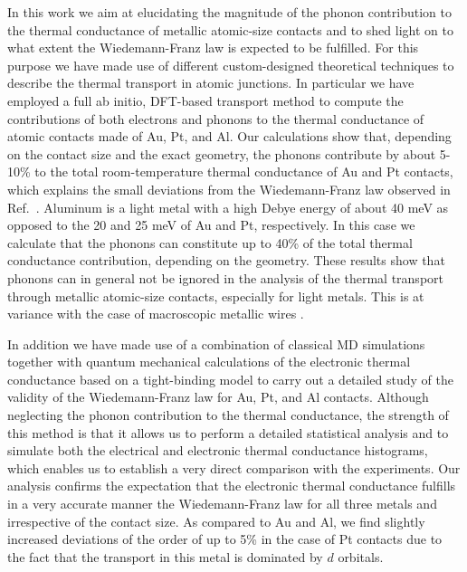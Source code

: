 \documentclass[aps,amsmath,amssymb,twocolumn,showpacs]{revtex4-1}
\begin{document}
In this work we aim at elucidating the magnitude of the phonon contribution to
the thermal conductance of metallic atomic-size contacts and to shed light on
to what extent the Wiedemann-Franz law is expected to be fulfilled. For this
purpose we have made use of different custom-designed theoretical techniques
to describe the thermal transport in atomic junctions. In particular we have
employed a full ab initio, DFT-based transport method to compute the
contributions of both electrons and phonons to the thermal conductance of
atomic contacts made of Au, Pt, and Al. Our calculations show that, depending
on the contact size and the exact geometry, the phonons contribute by about
5-10\% to the total room-temperature thermal conductance of Au and Pt
contacts, which explains the small deviations from the Wiedemann-Franz law
observed in Ref.~. Aluminum is a light metal with a high Debye
energy of about 40 meV as opposed to the 20 and 25 meV of Au and Pt,
respectively. In this case we calculate that the phonons can constitute up to
40\% of the total thermal conductance contribution, depending on the
geometry. These results show that phonons can in general not be ignored in the
analysis of the thermal transport through metallic atomic-size contacts,
especially for light metals. This is at variance with the case of macroscopic
metallic wires \cite{Jain2016}.

In addition we have made use of a combination of classical MD simulations
together with quantum mechanical calculations of the electronic thermal
conductance based on a tight-binding model to carry out a detailed study of
the validity of the Wiedemann-Franz law for Au, Pt, and Al contacts. Although
neglecting the phonon contribution to the thermal conductance, the strength of
this method is that it allows us to perform a detailed statistical analysis
and to simulate both the electrical and electronic thermal conductance
histograms, which enables us to establish a very direct comparison with the
experiments. Our analysis confirms the expectation that the electronic thermal
conductance fulfills in a very accurate manner the Wiedemann-Franz law for all
three metals and irrespective of the contact size. As compared
to Au and Al, we find slightly increased deviations of the order of up to
5\% in the case of Pt contacts due to the fact that the transport in this
metal is dominated by $d$ orbitals.
\end{document}
